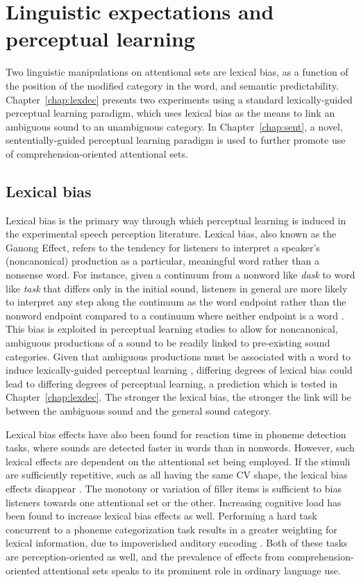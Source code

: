 \section{Linguistic expectations and perceptual learning}
\label{sec:linguistic}

Two linguistic manipulations on attentional sets are lexical bias, as a function of the position of the modified category in the word, and semantic predictability.
Chapter~\ref{chap:lexdec} presents two experiments using a standard lexically-guided perceptual learning paradigm, which uses lexical bias as the means to link an ambiguous sound to an unambiguous category.
In Chapter~\ref{chap:sent}, a novel, sententially-guided perceptual learning paradigm is used to further promote use of comprehension-oriented attentional sets.

\subsection{Lexical bias}
\label{sec:lexicalbias}

Lexical bias is the primary way through which perceptual learning is induced in the experimental speech perception literature.
Lexical bias, also known as the Ganong Effect, refers to the tendency for listeners to interpret a speaker's (noncanonical) production as a particular, meaningful word rather than a nonsense word.  
For instance, given a continuum from a nonword like \emph{dask} to word like \emph{task} that differs only in the initial sound, listeners in general are more likely to interpret any step along the continuum as the word endpoint rather than the nonword endpoint compared to a continuum where neither endpoint is a word \citep{Ganong1980}. 
This bias is exploited in perceptual learning studies to allow for noncanonical, ambiguous productions of a sound to be readily linked to pre-existing sound categories.
Given that ambiguous productions must be associated with a word to induce lexically-guided perceptual learning \citep{Norris2003}, differing degrees of lexical bias could lead to differing degrees of perceptual learning, a prediction which is tested in Chapter~\ref{chap:lexdec}.  
The stronger the lexical bias, the stronger the link will be between the ambiguous sound and the general sound category.

Lexical bias effects have also been found for reaction time in phoneme detection tasks, where sounds are detected faster in words than in nonwords.  However, such lexical effects are dependent on the attentional set being employed.  If the stimuli are sufficiently repetitive, such as all having the same CV shape, the lexical bias effects disappear \citep{Cutler1987}.  The monotony or variation of filler items is sufficient to bias listeners towards one attentional set or the other.
Increasing cognitive load has been found to increase lexical bias effects as well.
Performing a hard task concurrent to a phoneme categorization task results in a greater weighting for lexical information, due to impoverished auditory encoding \citep{Mattys2011}.
Both of these tasks are perception-oriented as well, and the prevalence of effects from comprehension-oriented attentional sets speaks to its prominent role in ordinary language use.

